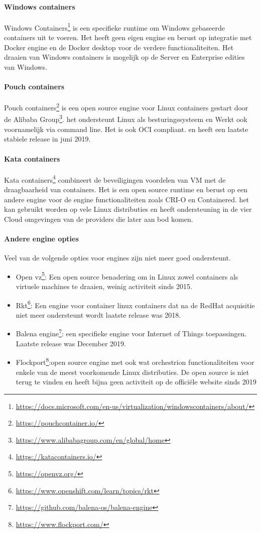 \paragraph{Windows containers}
Windows Containers\footnote{\url{https://docs.microsoft.com/en-us/virtualization/windowscontainers/about/}} is een specifieke runtime om Windows gebaseerde containers uit te voeren. Het heeft geen eigen engine en berust op integratie met Docker engine en de Docker desktop voor de verdere functionaliteiten.  Het draaien van Windows containers is mogelijk op de Server en Enterprise edities van Windows.
\paragraph{Pouch containers}
Pouch containers\footnote{\url{https://pouchcontainer.io/}} is een open source engine voor Linux containers gestart door de Alibaba Group\footnote{\url{https://www.alibabagroup.com/en/global/home}}. het ondersteunt Linux als besturingssysteem en Werkt ook voornamelijk via command line. Het is ook OCI compliant. en heeft een laatste stabiele release in juni 2019.
\paragraph{Kata containers}
Kata containers\footnote{\url{https://katacontainers.io/}} combineert de beveiligingen voordelen van VM met de draagbaarheid van containers.  Het is een open source runtime en berust op een andere engine voor  de engine functionaliteiten zoals CRI-O en Containered. het kan gebruikt worden op vele Linux distributies en heeft ondersteuning in de vier Cloud omgevingen van de providers die later aan bod komen.
\paragraph{Andere engine opties}
Veel van de volgende opties voor engines zijn niet meer goed ondersteunt.
\begin{itemize}
    \item Open vz\footnote{\url{https://openvz.org/}}: Een open source benadering om in Linux zowel containers als virtuele machines te draaien, weinig activiteit sinds 2015.
    \item Rkt\footnote{\url{https://www.openshift.com/learn/topics/rkt}}: Een engine voor container linux containers dat na de RedHat acquisitie niet meer ondersteunt wordt  laatste release was 2018.
    \item Balena engine\footnote{\url{https://github.com/balena-os/balena-engine}}: een specifieke engine voor Internet of Things toepassingen.  Laatste release was December 2019.
    \item Flockport\footnote{\url{https://www.flockport.com/}}:open source engine met ook wat orchestrion functionaliteiten voor enkele van de meest voorkomende Linux distributies. De open source is niet terug te vinden en heeft bijna geen activiteit op de officiële website sinds 2019
\end{itemize}


